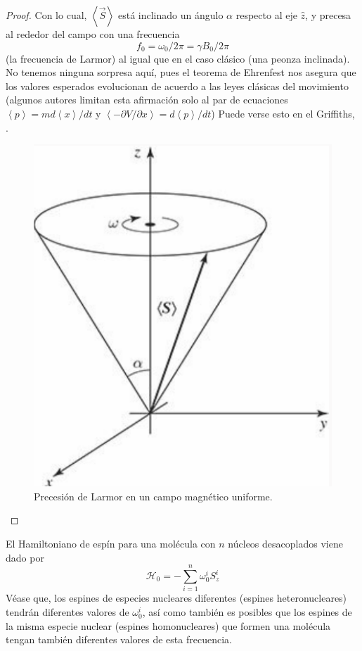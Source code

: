 \begin{proof}
Con lo cual, $\left\langle \vec{S} \right\rangle$ está inclinado un ángulo $\alpha$ respecto al eje $\hat{z}$, y precesa al rededor del campo con una frecuencia 
	\begin{equation}
	f_0 = \omega_0 / 2 \pi = \gamma B_0 / 2 \pi
	\end{equation}
(la frecuencia de Larmor) al igual que en el caso clásico (una peonza inclinada). No tenemos ninguna sorpresa aquí, pues el teorema de Ehrenfest nos asegura que los valores esperados evolucionan de acuerdo a las leyes clásicas del movimiento (algunos autores limitan esta afirmación solo al par de ecuaciones $\left\langle p \right\rangle = m d \left\langle x \right\rangle / dt$ y $\left\langle - \partial V / \partial x \right\rangle = d \left\langle p \right\rangle / dt$) Puede verse esto en el Griffiths, \cite{bib_griffiths_schroeter_2018}. 
	\begin{figure}[H]
	\centering 
	\includegraphics[width=0.30\linewidth]{Figuras/Fig_Harware_NMR_precession_griffiths.png}
	\caption{Precesión de Larmor en un campo magnético uniforme.}
	\label{Fig_Harware_NMR_precession_griffiths}
	\end{figure}

\end{proof}



El Hamiltoniano de espín para una molécula con $n$ núcleos desacoplados viene dado por 
	\begin{equation} \label{ec_Hardware_NMR_H_single}
	\mathcal{H}_0 = - \sum_{i=1}^n  \omega_0^i S_z^i
	\end{equation}
Véase que, los espines de especies nucleares diferentes (espines heteronucleares) tendrán diferentes valores de $\omega_0^i$, así como también es posibles que los espines de la misma especie nuclear (espines homonucleares) que formen una molécula  tengan también diferentes valores de esta frecuencia.


